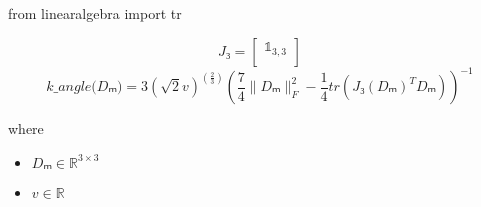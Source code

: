 \documentclass[12pt]{article}
\begin{document}
from linearalgebra import tr

\[
\textit{J₃} = \begin{bmatrix}
\mathbb{ 1 }_{ 3,3 }\\
\end{bmatrix}
\]
\[
\textit{k\_angle(Dₘ)} = 3( \sqrt{2}\textit{v})^{(\frac{2}{3})}(\frac{7}{4}\|\textit{Dₘ}\|_F^{2} - \frac{1}{4}tr(\textit{J₃}(\textit{Dₘ})^T\textit{Dₘ}))^{-1}
\]

where
\begin{itemize}
\item $\textit{Dₘ} \in \mathbb{R}^{ 3 \times 3 }$
\item $\textit{v} \in \mathbb{{R}}$
\end{itemize}
\end{document}
